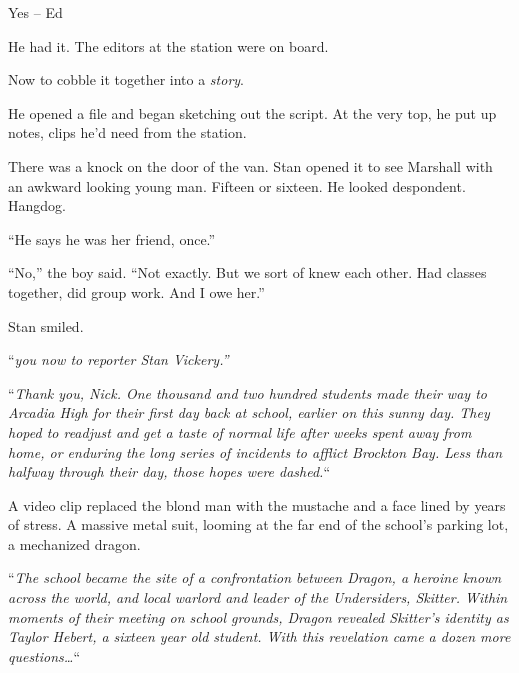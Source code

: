 Yes – Ed



He had it.  The editors at the station were on board.



Now to cobble it together into a \emph{story}.



He opened a file and began sketching out the script.  At the very top, he put up notes, clips he'd need from the station.



There was a knock on the door of the van.  Stan opened it to see Marshall with an awkward looking young man.  Fifteen or sixteen.  He looked despondent.  Hangdog.



``He says he was her friend, once.''



``No,'' the boy said.  ``Not exactly.  But we sort of knew each other.  Had classes together, did group work.  And I owe her.''



Stan smiled.



\sectionbreak



``\emph{\ldotstake you now to reporter Stan Vickery.''}



``\emph{Thank you, Nick.  One thousand and two hundred students made their way to Arcadia High for their first day back at school, earlier on this sunny day.  They hoped to readjust and get a taste of normal life after weeks spent away from home, or enduring the long series of incidents to afflict Brockton Bay.  Less than halfway through their day, those hopes were dashed.}``



A video clip replaced the blond man with the mustache and a face lined by years of stress.  A massive metal suit, looming at the far end of the school's parking lot, a mechanized dragon.



``\emph{The school became the site of a confrontation between Dragon, a heroine known across the world, and local warlord and leader of the Undersiders, Skitter.  Within moments of their meeting on school grounds, Dragon revealed Skitter's identity as Taylor Hebert, a sixteen year old student.  With this revelation came a dozen more questions\ldots}``



